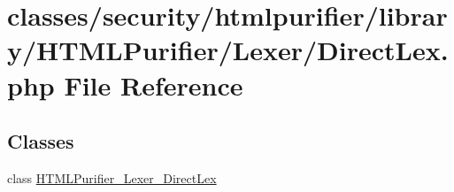 \hypertarget{DirectLex_8php}{\section{classes/security/htmlpurifier/library/\+H\+T\+M\+L\+Purifier/\+Lexer/\+Direct\+Lex.php File Reference}
\label{DirectLex_8php}
}
\subsection*{Classes}
\begin{DoxyCompactItemize}
\item 
class \hyperlink{classHTMLPurifier__Lexer__DirectLex}{H\+T\+M\+L\+Purifier\+\_\+\+Lexer\+\_\+\+Direct\+Lex}
\end{DoxyCompactItemize}
